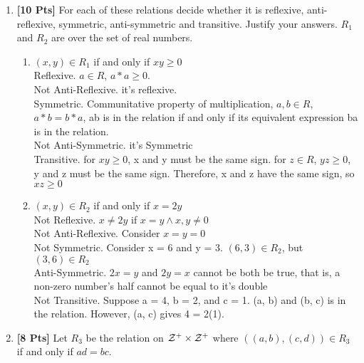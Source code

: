     \begin{enumerate}

        \item {\bf [10 Pts]} For each of these relations decide whether it is reflexive, anti-reflexive, symmetric, anti-symmetric and transitive. Justify your answers. $R_1$ and $R_2$ are over the set of real numbers.

        \begin{enumerate}

            \item $(x,y) \in R_1$ if and only if $xy \geq 0$ \\
                Reflexive. $a \in R$, $a * a \geq 0$. \\
                Not Anti-Reflexive. it's reflexive. \\
                Symmetric. Communitative property of multiplication, $a, b \in R$, $a * b = b * a$, ab is in the relation if and only if its equivalent expression ba is in the relation. \\
                Not Anti-Symmetric. it's Symmetric \\
                Transitive. for $xy \geq 0$, x and y must be the same sign. for $z \in R$, $yz \geq 0$, y and z must be the same sign. Therefore, x and z have the same sign, so $xz \geq 0$

            \item $(x,y) \in R_2$ if and only if $x = 2y$ \\
                Not Reflexive. $x \neq 2y$ if $x = y \land x, y \neq 0$ \\
                Not Anti-Reflexive. Consider $x = y = 0$ \\
                Not Symmetric. Consider x = 6 and y = 3. $(6, 3) \in R_2$, but $(3, 6) \in R_2$ \\
                Anti-Symmetric. $2x = y$ and $2y = x$ cannot be both be true, that is, a non-zero number's half cannot be equal to it's double \\
                Not Transitive. Suppose a = 4, b = 2, and c = 1. (a, b) and (b, c) is in the relation. However, (a, c) gives 4 = 2(1).

        \end{enumerate}

        \item {\bf [8 Pts]} Let $R_3$ be the relation on $\cal Z^+ \times Z^+$ where
        $((a,b), (c,d)) \in R_3$ if and only if $ad = bc$.

        \begin{enumerate}


\end{enumerate}
\end{enumerate}
